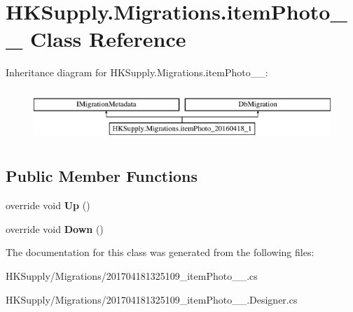 \hypertarget{class_h_k_supply_1_1_migrations_1_1item_photo__20160418__1}{}\section{H\+K\+Supply.\+Migrations.\+item\+Photo\+\_\+\_ Class Reference}
\label{class_h_k_supply_1_1_migrations_1_1item_photo__20160418__1}
Inheritance diagram for H\+K\+Supply.\+Migrations.\+item\+Photo\+\_\+\_\+:\begin{figure}[H]
\begin{center}
\leavevmode
\includegraphics[height=2.000000cm]{class_h_k_supply_1_1_migrations_1_1item_photo__20160418__1}
\end{center}
\end{figure}
\subsection*{Public Member Functions}
\begin{DoxyCompactItemize}
\item 
\mbox{\label{class_h_k_supply_1_1_migrations_1_1item_photo__20160418__1_aadf237d7fc810bf43e9e40afd9b4cad8}} 
override void {\bfseries Up} ()
\item 
\mbox{\label{class_h_k_supply_1_1_migrations_1_1item_photo__20160418__1_a106f5caf0169bd68f572ea9ac8862d4d}} 
override void {\bfseries Down} ()
\end{DoxyCompactItemize}


The documentation for this class was generated from the following files\+:\begin{DoxyCompactItemize}
\item 
H\+K\+Supply/\+Migrations/201704181325109\+\_\+item\+Photo\+\_\+\_.\+cs\item 
H\+K\+Supply/\+Migrations/201704181325109\+\_\+item\+Photo\+\_\+\_.\+Designer.\+cs\end{DoxyCompactItemize}
